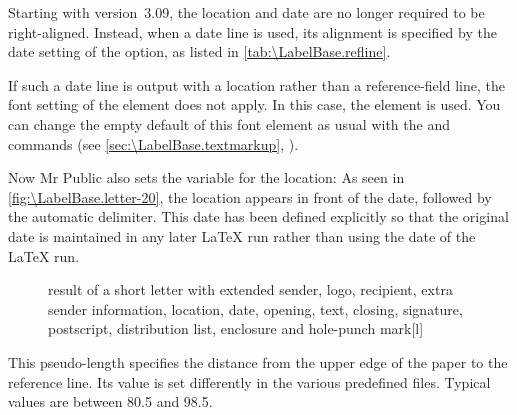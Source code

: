 Starting with version~3.09, the location
and date are no longer required to be right-aligned. Instead, when a date
line is used, its alignment is specified by the date setting of the
 option, as listed in
\autoref{tab:\LabelBase.refline}.

\BeginIndexGroup
{}%
If such a date line is output with a
location rather than a reference-field line, the font setting of the
 element does not apply. In this
case, the 
element is used. You can change the empty default of this font element as
usual with the  and
 commands (see
\autoref{sec:\LabelBase.textmarkup},
).%
\EndIndexGroup

\begin{Example}
  Now Mr Public also sets the variable for the location:%
  As seen in \autoref{fig:\LabelBase.letter-20}, the location appears
  in front of the date, followed by the automatic delimiter. This date has
  been defined explicitly so that the original date is maintained in any later
  \LaTeX{} run rather than using the date of the \LaTeX{} run.
  \begin{figure}
    \setcapindent{0pt}%
    \begin{captionbeside}
      {result of a short letter with extended sender, logo, recipient,
        extra sender information, location, date, opening, text, closing,
        signature, postscript, distribution list, enclosure and hole-punch
        mark}[l]
    \end{captionbeside}
    \label{fig:\LabelBase.letter-20}
  \end{figure}
\end{Example}
%
\EndIndexGroup
\EndIndexGroup
\EndIndexGroup


\begin{Declaration}
\end{Declaration}
This pseudo-length specifies the distance from the upper edge of the paper to
the reference line. Its value is set differently in the various predefined
 files.
Typical values are between 80.5 and 98.5.%
\EndIndexGroup


